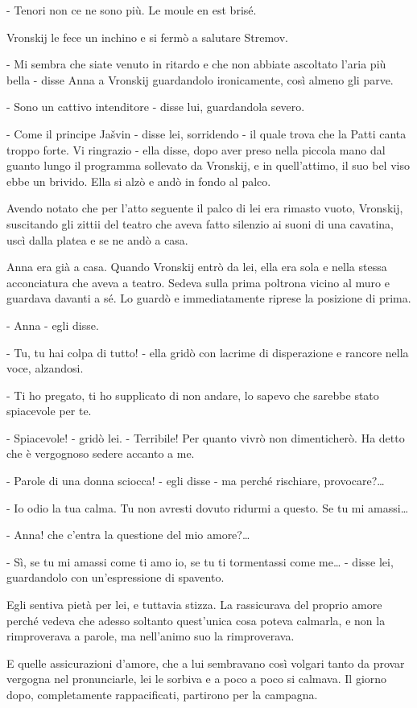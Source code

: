 - Tenori non ce ne sono più. Le moule en est brisé. 

Vronskij le fece un inchino e si fermò a salutare Stremov. 

- Mi sembra che siate venuto in ritardo e che non abbiate ascoltato l'aria più bella - disse Anna a Vronskij guardandolo ironicamente, così almeno gli parve. 

- Sono un cattivo intenditore - disse lui, guardandola severo. 

- Come il principe Jašvin - disse lei, sorridendo - il quale trova che la Patti canta troppo forte. Vi ringrazio - ella disse, dopo aver preso nella piccola mano dal guanto lungo il programma sollevato da Vronskij, e in quell'attimo, il suo bel viso ebbe un brivido. Ella si alzò e andò in fondo al palco. 

Avendo notato che per l'atto seguente il palco di lei era rimasto vuoto, Vronskij, suscitando gli zittii del teatro che aveva fatto silenzio ai suoni di una cavatina, uscì dalla platea e se ne andò a casa. 

Anna era già a casa. Quando Vronskij entrò da lei, ella era sola e nella stessa acconciatura che aveva a teatro. Sedeva sulla prima poltrona vicino al muro e guardava davanti a sé. Lo guardò e immediatamente riprese la posizione di prima. 

- Anna - egli disse. 

- Tu, tu hai colpa di tutto! - ella gridò con lacrime di disperazione e rancore nella voce, alzandosi. 

- Ti ho pregato, ti ho supplicato di non andare, lo sapevo che sarebbe stato spiacevole per te. 

- Spiacevole! - gridò lei. - Terribile! Per quanto vivrò non dimenticherò. Ha detto che è vergognoso sedere accanto a me. 

- Parole di una donna sciocca! - egli disse - ma perché rischiare, provocare?\ldots{} 

- Io odio la tua calma. Tu non avresti dovuto ridurmi a questo. Se tu mi amassi\ldots{} 

- Anna! che c'entra la questione del mio amore?\ldots{} 

- Sì, se tu mi amassi come ti amo io, se tu ti tormentassi come me\ldots{} - disse lei, guardandolo con un'espressione di spavento. 

Egli sentiva pietà per lei, e tuttavia stizza. La rassicurava del proprio amore perché vedeva che adesso soltanto quest'unica cosa poteva calmarla, e non la rimproverava a parole, ma nell'animo suo la rimproverava. 

E quelle assicurazioni d'amore, che a lui sembravano così volgari tanto da provar vergogna nel pronunciarle, lei le sorbiva e a poco a poco si calmava. Il giorno dopo, completamente rappacificati, partirono per la campagna. 
